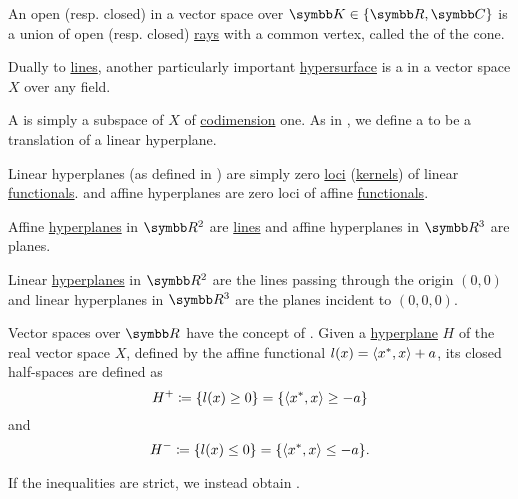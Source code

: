 \begin{definition}\label{def:geometric_cone}
  An open (resp. closed)  in a vector space over \( \BK \in \{ \BR, \BC \} \) is a union of open (resp. closed) \hyperref[def:geometric_ray]{rays} with a common vertex, called the  of the cone.
\end{definition}

\begin{definition}\label{def:hyperplane}
  Dually to \hyperref[def:geometric_line]{lines}, another particularly important \hyperref[def:hypersurface]{hypersurface} is a  in a vector space \( X \) over any field.

  \begin{defenum}
     A  is simply a subspace of \( X \) of \hyperref[def:vector_space_dimension]{codimension} one. As in , we define a  to be a translation of a linear hyperplane.

     Linear hyperplanes (as defined in ) are simply zero \hyperref[def:zero_locus]{loci} (\hyperref[def:semiring_kernel]{kernels}) of linear \hyperref[def:linear_operator]{functionals}. and affine hyperplanes are zero loci of affine \hyperref[def:affine_operator]{functionals}.
  \end{defenum}
\end{definition}

\begin{example}\label{ex:hyperplanes}
  Affine \hyperref[def:hyperplane]{hyperplanes} in \( \BR^2 \) are \hyperref[def:geometric_line]{lines} and affine hyperplanes in \( \BR^3 \) are planes.

  Linear \hyperref[def:hyperplane]{hyperplanes} in \( \BR^2 \) are the lines passing through the origin \( (0, 0) \) and linear hyperplanes in \( \BR^3 \) are the planes incident to \( (0, 0, 0) \).
\end{example}

\begin{definition}\label{def:half_space}
  Vector spaces over \( \BR \) have the concept of . Given a \hyperref[def:hyperplane]{hyperplane} \( H \) of the real vector space \( X \), defined by the affine functional \( l(x) = \left\langle x^*, x \right\rangle + a \), its closed half-spaces are defined as
  \begin{equation*}
    H^+ \coloneqq \{ l(x) \geq 0 \} = \{ \left\langle x^*, x \right\rangle \geq -a \}
  \end{equation*}
  and
  \begin{equation*}
    H^- \coloneqq \{ l(x) \leq 0 \} = \{ \left\langle x^*, x \right\rangle \leq -a \}.
  \end{equation*}

  If the inequalities are strict, we instead obtain .
\end{definition}

